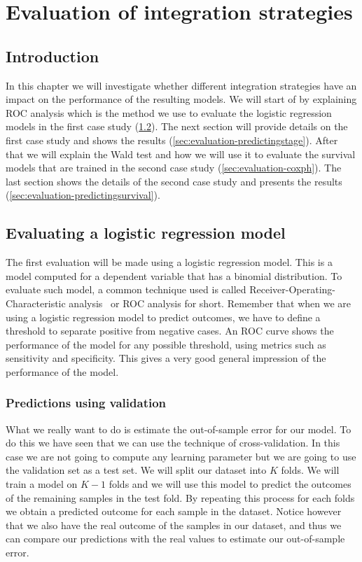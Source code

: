 \chapter{Evaluation of integration strategies}
\label{cha:evaluation}

\section{Introduction}
\label{sec:evaluation-introduction}
In this chapter we will investigate whether different integration strategies have an impact on the performance of the resulting models. We will start of by explaining ROC analysis which is the method we use to evaluate the logistic regression models in the first case study (\ref{sec:evaluation-logisticregression}). The next section will provide details on the first case study and shows the results (\ref{sec:evaluation-predictingstage}). After that we will explain the Wald test and how we will use it to evaluate the survival models that are trained in the second case study (\ref{sec:evaluation-coxph}). The last section shows the details of the second case study and presents the results (\ref{sec:evaluation-predictingsurvival}).


\section{Evaluating a logistic regression model}
\label{sec:evaluation-logisticregression}
The first evaluation will be made using a logistic regression model. This is a model computed for a dependent variable that has a binomial distribution. To evaluate such model, a common technique used is called Receiver-Operating-Characteristic analysis~\cite{zweig1993receiver}\cite{hajian2013receiver}\cite{wikiroc} or ROC analysis for short. Remember that when we are using a logistic regression model to predict outcomes, we have to define a threshold to separate positive from negative cases. An ROC curve shows the performance of the model for any possible threshold, using metrics such as sensitivity and specificity. This gives a very good general impression of the performance of the model.
\subsection{Predictions using validation}
What we really want to do is estimate the out-of-sample error for our model. To do this we have seen that we can use the technique of cross-validation. In this case we are not going to compute any learning parameter but we are going to use the validation set as a test set. We will split our dataset into $K$ folds. We will train a model on $K-1$ folds and we will use this model to predict the outcomes of the remaining samples in the test fold. By repeating this process for each folds we obtain a predicted outcome for each sample in the dataset. Notice however that we also have the real outcome of the samples in our dataset, and thus we can compare our predictions with the real values to estimate our out-of-sample error.
